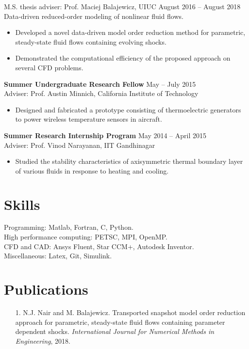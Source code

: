 \documentclass[margin]{res}
\begin{document}
\begin{resume}
M.S. thesis adviser: Prof. Maciej Balajewicz, UIUC \hfill August 2016 -- August 2018\\
Data-driven reduced-order modeling of nonlinear fluid flows.
\begin{itemize}
\item Developed a novel data-driven model order reduction method for parametric, steady-state fluid flows containing evolving shocks.
\vspace{-0.15cm}
\item Demonstrated the computational efficiency of the proposed approach on several CFD problems. 
\end{itemize}


{\bf Summer Undergraduate Research Fellow} \hfill May -- July 2015\\
Adviser: Prof. Austin Minnich, California Institute of Technology 
\begin{itemize}
\item Designed and fabricated a prototype consisting of thermoelectric generators to
power wireless temperature sensors in aircraft.
\end{itemize}

{\bf Summer Research Internship Program} \hfill   May 2014 -- April 2015\\
Adviser: Prof. Vinod Narayanan, IIT Gandhinagar
\begin{itemize}
\item Studied the stability characteristics of axisymmetric thermal boundary layer of various fluids in response to heating and cooling.
\end{itemize}

\section{\large Skills}		 
Programming: Matlab, Fortran, C, Python.\\
High performance computing: PETSC, MPI, OpenMP.\\
CFD and CAD: Ansys Fluent, Star CCM+, Autodesk Inventor.\\ Miscellaneous: Latex, Git, Simulink.

\newpage

\section{\large Publications}
 \begin{itemize}
 \item[1.] N.J. Nair and M. Balajewicz. Transported snapshot model order reduction approach for parametric, steady-state fluid flows containing parameter dependent shocks. \textit{International Journal for Numerical Methods in Engineering}, 2018.
 

\end{itemize}
\end{resume}
\end{document}
